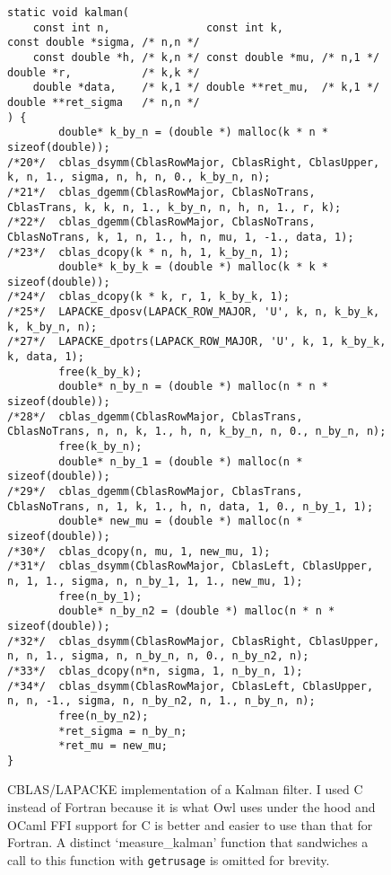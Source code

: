 \begin{sidewaysfigure}

    \begin{verbatim}
static void kalman(
    const int n,               const int k,                const double *sigma, /* n,n */
    const double *h, /* k,n */ const double *mu, /* n,1 */ double *r,           /* k,k */
    double *data,    /* k,1 */ double **ret_mu,  /* k,1 */ double **ret_sigma   /* n,n */
) {
        double* k_by_n = (double *) malloc(k * n * sizeof(double));
/*20*/  cblas_dsymm(CblasRowMajor, CblasRight, CblasUpper, k, n, 1., sigma, n, h, n, 0., k_by_n, n);
/*21*/  cblas_dgemm(CblasRowMajor, CblasNoTrans, CblasTrans, k, k, n, 1., k_by_n, n, h, n, 1., r, k);
/*22*/  cblas_dgemm(CblasRowMajor, CblasNoTrans, CblasNoTrans, k, 1, n, 1., h, n, mu, 1, -1., data, 1);
/*23*/  cblas_dcopy(k * n, h, 1, k_by_n, 1);
        double* k_by_k = (double *) malloc(k * k * sizeof(double));
/*24*/  cblas_dcopy(k * k, r, 1, k_by_k, 1);
/*25*/  LAPACKE_dposv(LAPACK_ROW_MAJOR, 'U', k, n, k_by_k, k, k_by_n, n);
/*27*/  LAPACKE_dpotrs(LAPACK_ROW_MAJOR, 'U', k, 1, k_by_k, k, data, 1);
        free(k_by_k);
        double* n_by_n = (double *) malloc(n * n * sizeof(double));
/*28*/  cblas_dgemm(CblasRowMajor, CblasTrans, CblasNoTrans, n, n, k, 1., h, n, k_by_n, n, 0., n_by_n, n);
        free(k_by_n);
        double* n_by_1 = (double *) malloc(n * sizeof(double));
/*29*/  cblas_dgemm(CblasRowMajor, CblasTrans, CblasNoTrans, n, 1, k, 1., h, n, data, 1, 0., n_by_1, 1);
        double* new_mu = (double *) malloc(n * sizeof(double));
/*30*/  cblas_dcopy(n, mu, 1, new_mu, 1);
/*31*/  cblas_dsymm(CblasRowMajor, CblasLeft, CblasUpper, n, 1, 1., sigma, n, n_by_1, 1, 1., new_mu, 1);
        free(n_by_1);
        double* n_by_n2 = (double *) malloc(n * n * sizeof(double));
/*32*/  cblas_dsymm(CblasRowMajor, CblasRight, CblasUpper, n, n, 1., sigma, n, n_by_n, n, 0., n_by_n2, n);
/*33*/  cblas_dcopy(n*n, sigma, 1, n_by_n, 1);
/*34*/  cblas_dsymm(CblasRowMajor, CblasLeft, CblasUpper, n, n, -1., sigma, n, n_by_n2, n, 1., n_by_n, n);
        free(n_by_n2);
        *ret_sigma = n_by_n;
        *ret_mu = new_mu;
}
    \end{verbatim}
    \caption{CBLAS/LAPACKE implementation of a Kalman filter. I used C instead
        of Fortran because it is what Owl uses under the hood and OCaml FFI
        support for C is better and easier to use than that for Fortran. A distinct
        `measure\_kalman' function that sandwiches a call to this function with
        \texttt{getrusage} is omitted for brevity.}\label{fig:cblas_kalman}

\end{sidewaysfigure}

